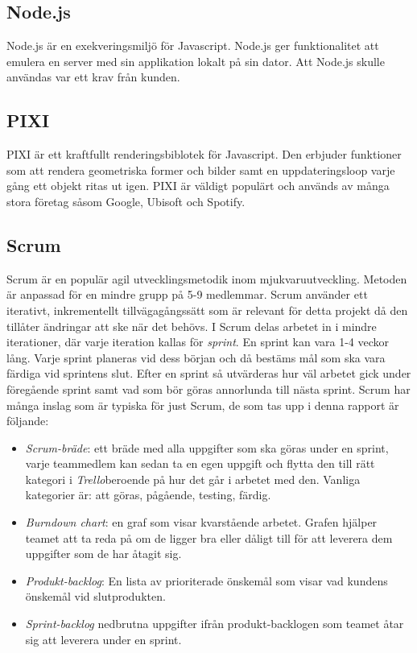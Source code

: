 \subsection*{Node.js}
Node.js \cite{Node} är en exekveringsmiljö för Javascript. Node.js ger funktionalitet att emulera en server med sin applikation lokalt på sin dator. Att Node.js skulle användas var ett krav från kunden.

\subsection*{PIXI}
PIXI \cite{Pixi} är ett kraftfullt renderingsbiblotek för Javascript. Den erbjuder funktioner som att rendera geometriska former och bilder samt en uppdateringsloop varje gång ett objekt ritas ut igen. PIXI är väldigt populärt och används av många stora företag såsom Google, Ubisoft och Spotify. 

\subsection*{Scrum}
Scrum är en populär agil utvecklingsmetodik inom mjukvaruutveckling. Metoden är anpassad för en mindre grupp på 5-9 medlemmar. Scrum använder ett iterativt, inkrementellt tillvägagångssätt som är relevant för detta projekt då den tillåter ändringar att ske när det behövs\cite{TheScrum}. I Scrum delas arbetet in i mindre iterationer, där varje iteration kallas för \textit{sprint}. En sprint kan vara 1-4 veckor lång. Varje sprint planeras vid dess början och då bestäms mål som ska vara färdiga vid sprintens slut. Efter en sprint så utvärderas hur väl arbetet gick under föregående sprint samt vad som bör göras annorlunda till nästa sprint. Scrum har många inslag som är typiska för just Scrum, de som tas upp i denna rapport är följande:

\begin{itemize}
	\item \textit{Scrum-bräde}: ett bräde med alla uppgifter som ska göras under en sprint, varje teammedlem kan sedan ta en egen uppgift och flytta den till rätt kategori i \textit{Trello}beroende på hur det går i arbetet med den. Vanliga kategorier är: att göras, pågående, testing, färdig.
	
	\item \textit{Burndown chart}: en graf som visar kvarstående arbetet. Grafen hjälper teamet att ta reda på om de ligger bra eller dåligt till för att leverera dem uppgifter som de har åtagit sig. 
	
	\item \textit{Produkt-backlog}: En lista av prioriterade önskemål som visar vad kundens önskemål vid slutprodukten.
	
	\item \textit{Sprint-backlog} nedbrutna uppgifter ifrån produkt-backlogen som teamet åtar sig att leverera under en sprint. 	
	
\end{itemize}

